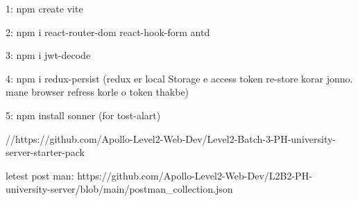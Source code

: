 1: npm create vite

2: npm i react-router-dom react-hook-form antd

3: npm i jwt-decode

4: npm i redux-persist (redux er local Storage e access token re-store korar jonno. mane browser refress korle o token thakbe)

5: npm install sonner (for tost-alart)


//https://github.com/Apollo-Level2-Web-Dev/Level2-Batch-3-PH-university-server-starter-pack

letest post man: https://github.com/Apollo-Level2-Web-Dev/L2B2-PH-university-server/blob/main/postman_collection.json